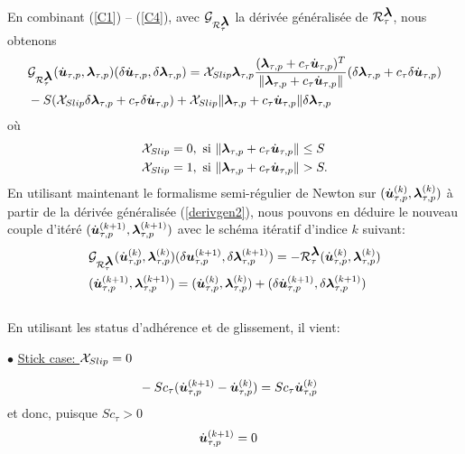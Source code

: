 \noindent En combinant (\ref{C1}) -- (\ref{C4}), avec ${\cal G}_{{\cal R}_{\tau}^{\mbox{\boldmath{$\lambda$}}}}$ la dérivée généralisée de ${\cal R}_{\tau}^{\mbox{\boldmath{$\lambda$}}}$, nous obtenons
\begin{align}
\label{derivgen2}
&{\cal G}_{{\cal R}_{\tau}^{\mbox{\boldmath{$\lambda$}}}}(\dot{\mbox{\boldmath{$u$}}}_{\tau, p},\mbox{\boldmath{$\lambda$}}_{\tau, p})(\delta\dot{\mbox{\boldmath{$u$}}}_{\tau, p},\delta\mbox{\boldmath{$\lambda$}}_{\tau, p})= {\cal X}_{Slip} \mbox{\boldmath{$\lambda$}}_{\tau, p}\frac{(\mbox{\boldmath{$\lambda$}}_{\tau, p}+c_\tau \dot{\mbox{\boldmath{$u$}}}_{\tau, p})^T}{\|\mbox{\boldmath{$\lambda$}}_{\tau, p}+c_\tau \dot{\mbox{\boldmath{$u$}}}_{\tau, p}\|}(\delta\mbox{\boldmath{$\lambda$}}_{\tau, p}+c_{\tau}\delta\dot{\mbox{\boldmath{$u$}}}_{\tau, p})\\
& - S ({\cal X}_{Slip}\delta\mbox{\boldmath{$\lambda$}}_{\tau, p}+c_{\tau}\delta\dot{\mbox{\boldmath{$u$}}}_{\tau, p})+{\cal X}_{Slip} \|\mbox{\boldmath{$\lambda$}}_{\tau, p}+c_\tau \dot{\mbox{\boldmath{$u$}}}_{\tau, p}\|\delta\mbox{\boldmath{$\lambda$}}_{\tau, p}
\end{align}
où
\begin{align}
&{\cal X}_{Slip} = 0,\ {\rm si}\ \|\blambda_{\tau, p}+c_\tau \dot\bu_{\tau, p}\|\leq S\\
& {\cal X}_{Slip} = 1,\ {\rm si}\ \|\blambda_{\tau, p}+c_\tau \dot\bu_{\tau, p}\|> S.
\end{align}
En utilisant maintenant le formalisme semi-régulier de Newton sur $(\dot{\mbox{\boldmath{$u$}}}_{\tau, p}^{(k)},\mbox{\boldmath{$\lambda$}}_{\tau, p}^{(k)})$ à partir de la dérivée généralisée (\ref{derivgen2}), nous pouvons en déduire le nouveau couple d'itéré $(\dot{\mbox{\boldmath{$u$}}}_{\tau, p}^{(k+1)},\mbox{\boldmath{$\lambda$}}_{\tau, p}^{(k+1)})$ avec le schéma itératif d'indice $k$ suivant: 
\begin{align}
&{\cal G}_{{\cal R}_{\tau}^{\mbox{\boldmath{$\lambda$}}}}(\dot{\mbox{\boldmath{$u$}}}_{\tau, p}^{(k)},\mbox{\boldmath{$\lambda$}}_{\tau, p}^{(k)})(\delta\mbox{\boldmath{$u$}}_{\tau, p}^{(k+1)},\delta\mbox{\boldmath{$\lambda$}}_{\tau, p}^{(k+1)})= - {\cal R}_{\tau}^{\mbox{\boldmath{$\lambda$}}} (\dot{\mbox{\boldmath{$u$}}}_{\tau, p}^{(k)},\mbox{\boldmath{$\lambda$}}_{\tau, p}^{(k)})\\
& (\dot{\mbox{\boldmath{$u$}}}_{\tau, p}^{(k+1)},\mbox{\boldmath{$\lambda$}}_{\tau, p}^{(k+1)}) =(\dot{\mbox{\boldmath{$u$}}}_{\tau, p}^{(k)},\mbox{\boldmath{$\lambda$}}_{\tau, p}^{(k)}) +(\delta\dot{\mbox{\boldmath{$u$}}}_{\tau, p}^{(k+1)},\delta\mbox{\boldmath{$\lambda$}}_{\tau, p}^{(k+1)})
\end{align}\\
En utilisant les status d'adhérence et de glissement, il vient:

$\bullet$ \underline{Stick case: ${\cal X}_{Slip} = 0$}

\begin{align}
&- S c_{\tau}(\dot{\mbox{\boldmath{$u$}}}_{\tau, p}^{(k+1)}-\dot{\mbox{\boldmath{$u$}}}_{\tau, p}^{(k)})= S c_\tau\dot{\mbox{\boldmath{$u$}}}_{\tau, p}^{(k)}
\end{align}
et donc, puisque $S c_\tau>0$
\begin{align}
&\dot{\mbox{\boldmath{$u$}}}_{\tau, p}^{(k+1)}= 0
\end{align}

